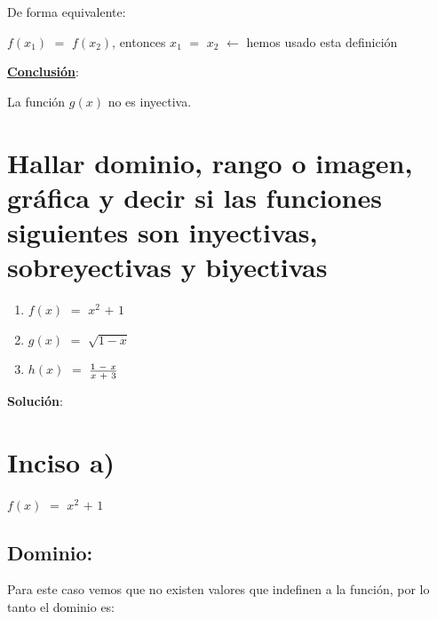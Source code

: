 \documentclass[12pt]{article}
\begin{document}
De forma equivalente: \vspace{0.5cm}

\hspace{3cm}$f(x_{1})$ $=$ $f(x_{2})$, entonces $x_{1}$ $=$ $x_{2}$ $\longleftarrow$ hemos usado esta definición \vspace{0.5cm} 



{\textcolor{Tarawera}{\underline{\bfseries{Conclusión}}}:}

\hspace{4cm} La función $g(x)$ no es inyectiva. 

\newpage

\section*{{\textsf{Hallar dominio, rango o imagen, gráfica y decir si las funciones siguientes son inyectivas, sobreyectivas y biyectivas}}}

\begin{enumerate}[label=\alph*)]
\centering
    \item $f(x)$ $=$ $x^{2}$ $+$ $1$ \vspace{0.5cm}
    
    \item $g(x)$ $=$ $\sqrt{1-x}$ \vspace{0.5cm}
    
    \item $h(x)$ $=$ {\LARGE{$\frac{1 \hspace{0.1cm} - \hspace{0.1cm} x}{x \hspace{0.1cm} + \hspace{0.1cm} 3}$}} \vspace{0.5cm}
\end{enumerate} \vspace{0.5cm}

{\textcolor{Cinnabar}{\bfseries{Solución}}:} \vspace{0.5cm}

\section*{{\textcolor{Tarawera}{\textsf{Inciso a)}}}} $f(x)$ $=$ $x^{2}$ $+$ $1$ \vspace{0.5cm} 

\subsection*{{\textcolor{Lochinvar}{\bfseries{Dominio}:}}} Para este caso vemos que no existen valores que indefinen a la función, por lo tanto el dominio es: \vspace{0.5cm}
\end{document}
